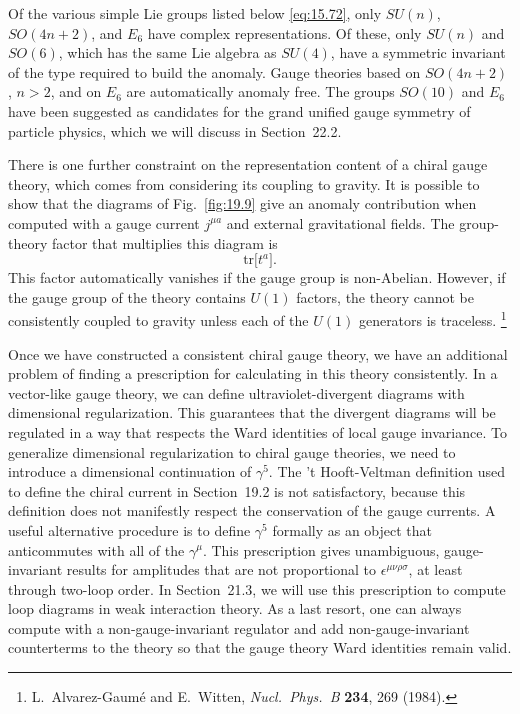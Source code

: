 Of the various simple Lie groups listed below \eqref{eq:15.72}, only
$SU(n)$, $SO(4n+2)$, and $E_6$ have complex representations.  Of these, only
$SU(n)$ and $SO(6)$, which has the same Lie algebra as $SU(4)$, have a
symmetric invariant of the type required to build the anomaly.  Gauge
theories based on $SO(4n+2)$, $n > 2$, and on $E_6$ are automatically
anomaly free.  The groups $SO(10)$ and $E_6$ have been suggested as
candidates for the grand unified gauge symmetry of particle physics, which we
will discuss in Section~22.2.

There is one further constraint on the representation content of a chiral
gauge theory, which comes from considering its coupling to gravity.  It is
possible to show that the diagrams of Fig.~\ref{fig:19.9} give an anomaly
contribution when computed with a gauge current $j^{\mu a}$ and external
gravitational fields.  The group-theory factor that multiplies this diagram
is
\begin{equation}
  \mathrm{tr}\bigl[ t^a \bigr] .
  \label{eq:19.143}
\end{equation}
This factor automatically vanishes if the gauge group is non-Abelian.
However, if the gauge group of the theory contains $U(1)$ factors, the theory
cannot be consistently coupled to gravity unless each of the $U(1)$
generators is traceless.%
\footnote{L.~Alvarez-Gaum\'e and E.~Witten, \emph{Nucl.\ Phys.\ B} \textbf{234},
269 (1984).}

Once we have constructed a consistent chiral gauge theory, we have an
additional problem of finding a prescription for calculating in this theory
consistently.  In a vector-like gauge theory, we can define ultraviolet-divergent
diagrams with dimensional regularization.  This guarantees that the divergent
diagrams will be regulated in a way that respects the Ward identities of
local gauge invariance.  To generalize dimensional regularization to chiral
gauge theories, we need to introduce a dimensional continuation of
$\gamma^5$.  The 't Hooft-Veltman definition used to define the chiral current
in Section~19.2 is not satisfactory, because this definition does not
manifestly respect the conservation of the gauge currents.  A useful
alternative procedure is to define $\gamma^5$ formally as an object that
anticommutes with all of the $\gamma^\mu$.  This prescription gives
unambiguous, gauge-invariant results for amplitudes that are not proportional
to $\epsilon^{\mu\nu\rho\sigma}$, at least through two-loop order.  In
Section~21.3, we will use this prescription to compute loop diagrams in weak
interaction theory.  As a last resort, one can always compute with a
non-gauge-invariant regulator and add non-gauge-invariant counterterms to the
theory so that the gauge theory Ward identities remain valid.

